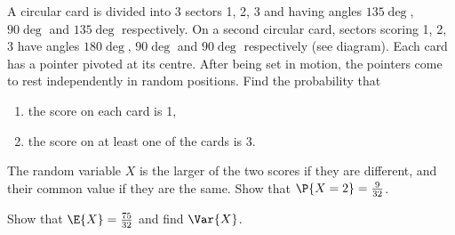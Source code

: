 \begin{problem}
    \begin{center}
    \end{center}

    A circular card is divided into 3 sectors 1, 2, 3 and having angles $135\deg$, $90\deg$ and $135\deg$ respectively. On a second circular card, sectors scoring 1, 2, 3 have angles $180\deg$, $90\deg$ and $90\deg$ respectively (see diagram). Each card has a pointer pivoted at its centre. After being set in motion, the pointers come to rest independently in random positions. Find the probability that
    \begin{enumerate}
        \item the score on each card is 1,
        \item the score on at least one of the cards is 3.
    \end{enumerate}

    The random variable $X$ is the larger of the two scores if they are different, and their common value if they are the same. Show that $\P{X = 2} = \frac{9}{32}$.

    Show that $\E{X} = \frac{75}{32}$ and find $\Var{X}$.
\end{problem}
